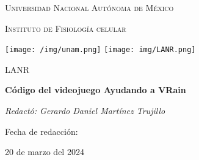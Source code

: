 \documentclass[11pt]{scrartcl} %
\begin{document}
\begin{titlepage}
    \centering

    {\scshape\LARGE Universidad Nacional Autónoma de México \par}

    \vspace{1cm}

    {\scshape\Large Instituto de Fisiología celular\par}

    \vspace{1.5cm}

    \begin{center}
        \texttt{[image: /img/unam.png]}
        \texttt{[image: img/LANR.png]}
    \end{center}

    \vspace{1 cm}

    {\LARGE LANR \par}

    \vspace{.3cm}

    {\huge\bfseries Código del videojuego Ayudando a VRain\par}

	\vspace{1.9cm}

    \large{\itshape{Redactó: Gerardo Daniel Martínez Trujillo}}\\

    \vfill

    Fecha de redacción:\\
    {\large 20 de marzo del 2024\par}

\end{titlepage}

\tableofcontents
\end{document}
